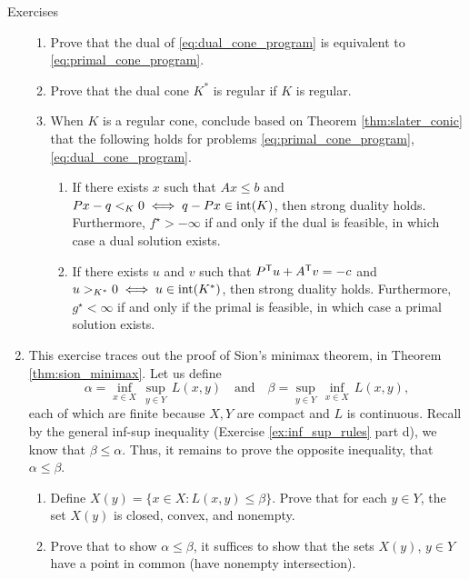 \begin{xcb}{Exercises}
\begin{enumerate}[label=\thechapter.\arabic*]
\begin{enumerate}[label=\alph*.]
\item Prove that the dual of \eqref{eq:dual_cone_program} is equivalent to
  \eqref{eq:primal_cone_program}. 

\item Prove that the dual cone $K^*$ is regular if $K$ is regular. 

\item When $K$ is a regular cone, conclude based on Theorem
  \ref{thm:slater_conic} that the following holds for problems 
  \eqref{eq:primal_cone_program}, \eqref{eq:dual_cone_program}.
  
  \begin{enumerate}[label=(\roman*)]  
  \item If there exists $x$ such that $Ax \leq b$ and $Px - q <_K 0 \iff q - Px 
    \in \operatorname{int}(K)$, then strong duality holds. Furthermore, $f^\star >
    -\infty$ if and only if the dual is feasible, in which case a dual solution 
    exists.  
  \item If there exists $u$ and $v$ such that $P^{\mathsf{T}} u + A^{\mathsf{T}} v = -c$ and $u
    >_{K^*} 0 \iff u \in \operatorname{int}(K^*)$, then strong duality
    holds. Furthermore, $g^\star < \infty$ if and only if the primal is
    feasible, in which case a primal solution exists. 
  \end{enumerate}
\end{enumerate}

\item \label{ex:sion_minimax}
  This exercise traces out the proof of Sion's minimax theorem, in Theorem 
  \ref{thm:sion_minimax}. Let us define 
  \[
  \alpha = \inf_{x \in X} \, \sup_{y \in Y} \, L(x,y) \quad \text{and} \quad  
  \beta = \sup_{y \in Y} \, \inf_{x \in X} \, L(x,y),
  \]
  each of which are finite because $X,Y$ are compact and $L$ is continuous.
  Recall by the general inf-sup inequality (Exercise \ref{ex:inf_sup_rules}
  part d), we know that $\beta \leq \alpha$. Thus, it remains to prove the
  opposite inequality, that $\alpha \leq \beta$.  

\begin{enumerate}[label=\alph*.]
\item Define $X(y) = \{x \in X : L(x,y) \leq \beta\}$. Prove that for each $y
  \in Y$, the set $X(y)$ is closed, convex, and nonempty. 
  
\item Prove that to show $\alpha \leq \beta$, it suffices to show that the sets
  $X(y)$, $y \in Y$ have a point in common (have nonempty intersection).    


\end{enumerate}
\end{enumerate}
\end{xcb}
